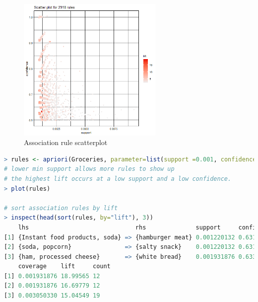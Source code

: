 \documentclass{article}
\begin{document}
\begin{figure}[H]
    \centering
    \includegraphics[width=7cm]{images/apriori.png}
    \caption{Association rule scatterplot}
\end{figure}
\begin{lstlisting}[language=R]
> rules <- apriori(Groceries, parameter=list(support =0.001, confidence=0.6, target="rules"))
# lower min support allows more rules to show up
# the highest lift occurs at a low support and a low confidence.
> plot(rules)

# sort association rules by lift
> inspect(head(sort(rules, by="lift"), 3))
    lhs                              rhs              support     confidence
[1] {Instant food products, soda} => {hamburger meat} 0.001220132 0.6315789 
[2] {soda, popcorn}               => {salty snack}    0.001220132 0.6315789 
[3] {ham, processed cheese}       => {white bread}    0.001931876 0.6333333 
    coverage    lift     count
[1] 0.001931876 18.99565 12   
[2] 0.001931876 16.69779 12   
[3] 0.003050330 15.04549 19  
\end{lstlisting}
\end{document}
